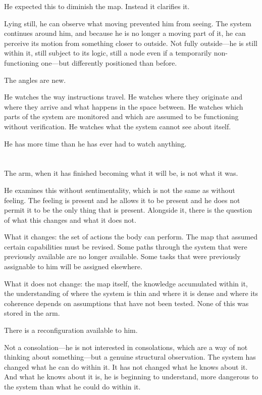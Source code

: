 He expected this to diminish the map. Instead it clarifies it.

Lying still, he can observe what moving prevented him from seeing.
The system continues around him, and because he is no longer a
moving part of it, he can perceive its motion from something
closer to outside. Not fully outside---he is still within it,
still subject to its logic, still a node even if a temporarily
non-functioning one---but differently positioned than before.

The angles are new.

He watches the way instructions travel. He watches where they
originate and where they arrive and what happens in the space
between. He watches which parts of the system are monitored and
which are assumed to be functioning without verification. He
watches what the system cannot see about itself.

He has more time than he has ever had to watch anything.

\section{}

The arm, when it has finished becoming what it will be, is not
what it was.

He examines this without sentimentality, which is not the same as
without feeling. The feeling is present and he allows it to be
present and he does not permit it to be the only thing that is
present. Alongside it, there is the question of what this changes
and what it does not.

What it changes: the set of actions the body can perform. The
map that assumed certain capabilities must be revised. Some paths
through the system that were previously available are no longer
available. Some tasks that were previously assignable to him will
be assigned elsewhere.

What it does not change: the map itself, the knowledge accumulated
within it, the understanding of where the system is thin and where
it is dense and where its coherence depends on assumptions that
have not been tested. None of this was stored in the arm.

There is a reconfiguration available to him.

Not a consolation---he is not interested in consolations, which
are a way of not thinking about something---but a genuine
structural observation. The system has changed what he can do
within it. It has not changed what he knows about it. And what
he knows about it is, he is beginning to understand, more
dangerous to the system than what he could do within it.

